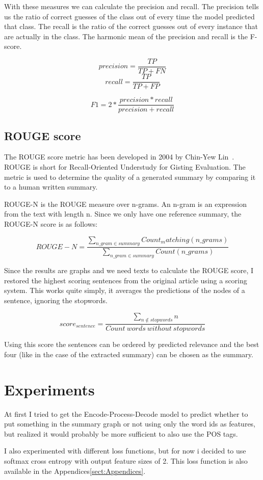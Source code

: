 With these measures we can calculate the precision and recall. The precision tells us the ratio of correct guesses of the class out of every time the model predicted that class. The recall is the ratio of the correct guesses out of every instance that are actually in the class. The harmonic mean of the precision and recall is the F-score.

\[precision = \frac{TP}{TP + FN}\]
\[recall = \frac{TP}{TP + FP}\]

\[F1 = 2 * \frac{precision * recall}{precision + recall}\]

\subsection{ROUGE score}
The ROUGE score metric has been developed in 2004 by Chin-Yew Lin~\cite{ROUGE}. ROUGE is short for Recall-Oriented Understudy for Gisting Evaluation. The metric is used to determine the quality of a generated summary by comparing it to a human written summary.

ROUGE-N is the ROUGE measure over n-grams. An n-gram is an expression from the text with length n.
Since we only have one reference summary, the ROUGE-N score is as follows:

\[ROUGE-N = \frac{\sum_{n\_gram \in summary} Count_matching (n\_grams)}{\sum_{n\_gram \in summary} Count(n\_grams)}\]

Since the results are graphs and we need texts to calculate the ROUGE score, I restored the highest scoring sentences from the original article using a scoring system. This works quite simply, it averages the predictions of the nodes of a sentence, ignoring the stopwords.

\[score_{sentence} = \frac{\sum_{n \notin stopwords} n}{Count\ words\ without\ stopwords} \]

Using this score the sentences can be ordered by predicted relevance and the best four (like in the case of the extracted summary) can be chosen as the summary.

\section{Experiments}

At first I tried to get the Encode-Process-Decode model to predict whether to put something in the summary graph or not using only the word ids as features, but realized it would probably be more sufficient to also use the POS tags.

I also experimented with different loss functions, but for now i decided to use softmax cross entropy with output feature sizes of 2. This loss function is also available in the Appendices\ref{sect:Appendices}.


